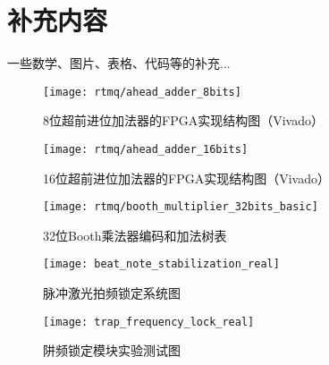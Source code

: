 
\chapter{补充内容}

一些数学、图片、表格、代码等的补充... 

\begin{figure}
    \centering
    \caption[8位超前进位加法器的FPGA实现结构图]{8位超前进位加法器的FPGA实现结构图（Vivado）\label{fig:ahead_adder_8bits}}
    \texttt{[image: rtmq/ahead\_adder\_8bits]}
\end{figure}

\begin{figure}
    \centering
    \caption[16位超前进位加法器的FPGA实现结构图]{16位超前进位加法器的FPGA实现结构图（Vivado）\label{fig:ahead_adder_16bits}}
    \texttt{[image: rtmq/ahead\_adder\_16bits]}
\end{figure}


\begin{figure}
    \centering
    \caption[32位Booth乘法器编码和加法树表]{32位Booth乘法器编码和加法树表\label{fig:booth_multiplier_32bits_basic}}
    \texttt{[image: rtmq/booth\_multiplier\_32bits\_basic]}
\end{figure}

\begin{figure}
    \centering
    \caption[脉冲激光拍频锁定系统图]{脉冲激光拍频锁定系统图\label{fig:beat_note_stabilization_real}}
    \texttt{[image: beat\_note\_stabilization\_real]}
\end{figure}

\begin{figure}
    \centering
    \caption[阱频锁定模块实验测试图]{阱频锁定模块实验测试图\label{fig:trap_frequency_lock_real}}
    \texttt{[image: trap\_frequency\_lock\_real]}
\end{figure}